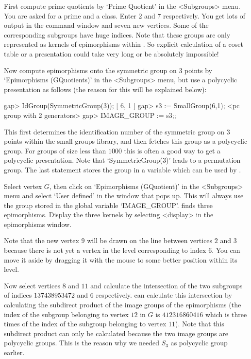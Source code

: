 First compute prime quotients by `Prime Quotient' in the <Subgroups>
menu. You are asked for a prime and a class. Enter $2$ and $7$
respectively. You get lots of output in the {\GAP} command window and
seven new vertices. Some of the corresponding subgroups have huge
indices. Note that these groups are only represented as kernels of
epimorphisms within {\GAP}. So explicit calculation of a coset table
or a presentation could take very long or be absolutely impossible!

Now compute epimorphisms onto the symmetric group on $3$ points by
`Epimorphisms (GQuotients)' in the <Subgroups> menu, but use a polycyclic 
presentation as follows (the reason for this will be explained below):

\begintt
gap> IdGroup(SymmetricGroup(3));
[ 6, 1 ]
gap> s3 := SmallGroup(6,1);
<pc group with 2 generators>
gap> IMAGE_GROUP := s3;;
\endtt

This first determines the identification number of the symmetric group 
on $3$ points within the small groups library, and then fetches this
group as a polycyclic group. For groups of size less than $1000$ this
is often a good way to get a polycyclic presentation. Note that
`SymmetricGroup(3)' leads to a permutation group. The last statement
stores the group in a variable which can be used by {\XGAP}. 

Select vertex $G$, then click on `Epimorphisms (GQuotient)' in the
<Subgroups> menu and select `User defined' in the window that pops up.
This will always use the group stored in the global variable
`IMAGE_GROUP'. {\GAP} finds three epimorphisms. Display the three
kernels by selecting <display> in the epimorphisms window.

Note that the new vertex $9$ will be drawn on the line between
vertices $2$ and $3$ because there is not yet a vertex in the level
corresponding to index 6. You can move it aside by dragging it with
the mouse to some better position within its level.

Now select vertices $8$ and $11$ and calculate the intersection of the 
two subgroups of indices $137438953472$ and $6$ respectively. {\GAP}
can calculate this intersection by calculating the subdirect product
of the image groups of the epimorphisms (the index of the subgroup
belonging to vertex $12$ in $G$ is $412316860416$ which is three times
of the index of the subgroup belonging to vertex $11$). Note that this 
subdirect product can only be calculated because the two image groups
are polycyclic groups. This is the reason why we needed $S_3$ as
polycyclic group earlier.

